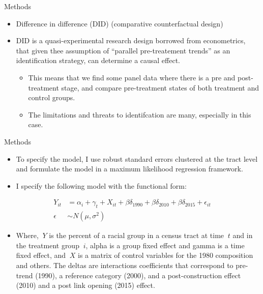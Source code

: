 \documentclass[11pt,ignorenonframetext,]{beamer}
\providecommand{\tightlist}{%
  \setlength{\itemsep}{0pt}\setlength{\parskip}{0pt}}
\begin{document}
\begin{frame}{Methods}
\protect\hypertarget{methods}{}

\begin{itemize}
\tightlist
\item
  Difference in difference (DID) (comparative counterfactual design)
\item
  DID is a quasi-experimental research design borrowed from
  econometrics, that given thee assumption of ``parallel pre-treatement
  trends'' as an identification strategy, can determine a causal effect.

  \begin{itemize}
  \tightlist
  \item
    This means that we find some panel data where there is a pre and
    post-treatment stage, and compare pre-treatment states of both
    treatment and control groups.
  \item
    The limitations and threats to identifcation are many, especially in
    this case.
  \end{itemize}
\end{itemize}

\end{frame}

\begin{frame}{Methods}
\protect\hypertarget{methods-1}{}

\begin{itemize}
\tightlist
\item
  To specify the model, I use robust standard errors clustered at the
  tract level and formulate the model in a maximum likelihood regression
  framework.
\item
  I specify the following model with the functional form:
\end{itemize}

\[
\begin{aligned}
  Y_{it} &= \alpha_i + \gamma_{t} + X_{it} +\beta{\delta_{1990}} + \beta{\delta_{2010}} + \beta{\delta_{2015}} + \epsilon_{it} \\
  \epsilon &\sim N(\mu,\sigma^2)
\end{aligned}
\]

\begin{itemize}
\tightlist
\item
  Where, \(\ Y\) is the percent of a racial group in a census tract at
  time \(\ t\) and in the treatment group \(\ i\), alpha is a group
  fixed effect and gamma is a time fixed effect, and \(\ X\) is a matrix
  of control variables for the 1980 composition and others. The deltas
  are interactions coefficients that correspond to pre-trend (1990), a
  reference category (2000), and a post-construction effect (2010) and a
  post link opening (2015) effect.
\end{itemize}

\end{frame}
\end{document}
